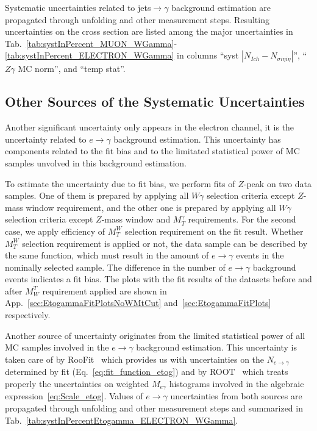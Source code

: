  Systematic uncertainties related to jets$\rightarrow\gamma$ background estimation are propagated through unfolding and other measurement steps. Resulting uncertainties on the cross section are listed among the major uncertainties in Tab.~\ref{tab:systInPercent_MUON_WGamma}-\ref{tab:systInPercent_ELECTRON_WGamma} in columns ``syst $|N_{Ich}-N_{\sigma{i\eta i\eta}}|$'', ``$Z\gamma$ MC norm'', and ``temp stat''.

\subsection{Other Sources of the Systematic Uncertainties}
\label{sec:Systematics_OtherSources}

Another significant uncertainty only appears in the electron channel, it is the uncertainty related to $e\rightarrow\gamma$ background estimation. This uncertainty has components related to the fit bias and to the limitated statistical power of MC samples unvolved in this background estimation. 

To estimate the uncertainty due to fit bias, we perform fits of $Z$-peak on two data samples. One of them is prepared by applying all $W\gamma$ selection criteria except $Z$-mass window requirement, and the other one is prepared by applying all $W\gamma$ selection criteria except $Z$-mass window and $M_T^{\gamma}$ requirements. For the second case, we apply efficiency of $M_T^W$ selection requirement on the fit result. Whether $M_T^W$ selection requirement is applied or not, the data sample can be described by the same function, which must result in the amount of $e\rightarrow\gamma$ events in the nominally selected sample. The difference in the number of $e\rightarrow\gamma$ background events indicates a fit bias. The plots with the fit results of the datasets before and after $M_W^T$ requirement applied are shown in App.~\ref{sec:EtogammaFitPlotsNoWMtCut} and~\ref{sec:EtogammaFitPlots} respectively.

Another source of uncertainty originates from the limited statistical power of all MC samples involved in the $e\rightarrow\gamma$ background estimation. This uncertainty is taken care of by RooFit~\cite{ref_RooFit} which provides us with uncertainties on the $N_{e\rightarrow\gamma}$ determined by fit (Eq.~\ref{eq:fit_function_etog}) and by ROOT~\cite{ref_ROOT} which treats properly the uncertainties on weighted $M_{e\gamma}$ histograms involved in the algebraic expression~\ref{eq:Scale_etog}. Values of $e\rightarrow\gamma$ uncertainties from both sources are propagated through unfolding and other measurement steps and summarized in Tab.~\ref{tab:systInPercentEtogamma_ELECTRON_WGamma}.

